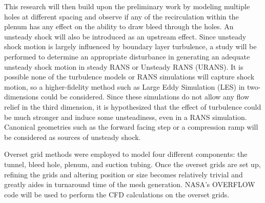 This research will then build upon the preliminary work by modeling multiple holes at different spacing and observe if any of the recirculation within the plenum has any effect on the ability to draw bleed through the holes. An unsteady shock will also be introduced as an upstream effect. Since unsteady shock motion is largely influenced by boundary layer turbulence, a study will be performed to determine an appropriate disturbance in generating an adequate unsteady shock motion in steady RANS or Unsteady RANS (URANS). It is possible none of the turbulence models or RANS simulations will capture shock motion, so a higher-fidelity method such as Large Eddy Simulation (LES) in two-dimensions could be considered. Since these simulations do not allow any flow relief in the third dimension, it is hypothesized that the effect of turbulence could be much stronger and induce some unsteadiness, even in a RANS simulation. Canonical geometries such as the forward facing step or a compression ramp will be considered as sources of unsteady shock.

Overset grid methods were employed to model four different components: the tunnel, bleed hole, plenum, and suction tubing. Once the overset grids are set up, refining the grids and altering position or size becomes relatively trivial and greatly aides in turnaround time of the mesh generation. NASA's OVERFLOW code will be used to perform the CFD calculations on the overset grids.

